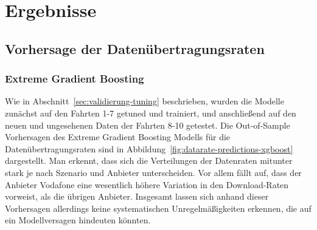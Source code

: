 \section{Ergebnisse}

\subsection{Vorhersage der Daten\"ubertragungsraten}

\subsubsection{Extreme Gradient Boosting}

Wie in Abschnitt~\ref{sec:validierung-tuning} beschrieben, wurden die Modelle zun\"achst auf den Fahrten \mbox{1-7} getuned
und trainiert, und anschlie{\ss}end auf den neuen und ungesehenen Daten der Fahrten 8-10 getestet.
Die Out-of-Sample Vorhersagen des Extreme Gradient Boosting Modells f\"ur die Daten\"ubertragungsraten sind
in Abbildung~\ref{fig:datarate-predictions-xgboost} dargestellt.
Man erkennt, dass sich die Verteilungen der Datenraten mitunter stark je nach Szenario und Anbieter unterscheiden.
Vor allem f\"allt auf, dass der Anbieter Vodafone eine wesentlich h\"ohere Variation in den Download-Raten vorweist,
als die \"ubrigen Anbieter.
Insgesamt lassen sich anhand dieser Vorhersagen allerdings keine systematischen Unregelm\"a{\ss}igkeiten erkennen,
die auf ein Modellversagen hindeuten k\"onnten.
